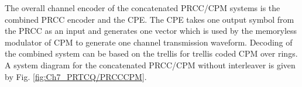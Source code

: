 \documentclass[12pt,twoside,onecolumn,a4paper,english]{IEEEtran2e}
\begin{document}
The overall channel encoder of the concatenated PRCC/CPM systems
is the combined PRCC encoder and the CPE. The CPE takes one output
symbol from the PRCC as an input and generates one vector which is
used by the memoryless modulator of CPM to generate one
channel transmission waveform. %
%
Decoding of the combined
system can be based on the trellis for trellis coded CPM over
rings. A system diagram for the concatenated PRCC/CPM without interleaver is given by Fig. \ref{fig:Ch7_PRTCQ/PRCCCPM}.
\end{document}
